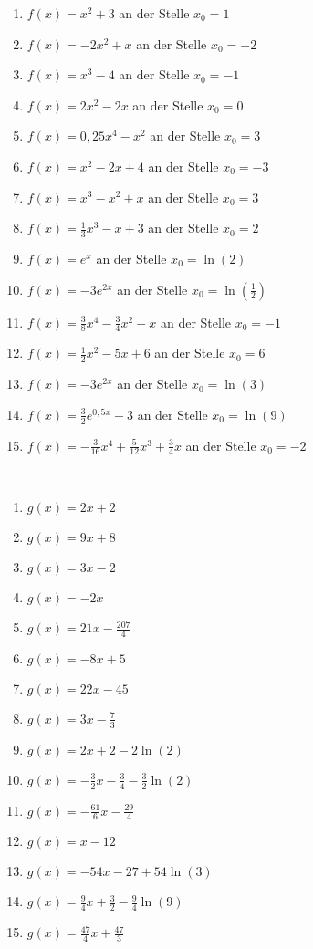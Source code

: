 \begin{Exercise}[title={\raggedright Bestimme jeweils die Tangentengleichung.}, label=tangentenBestimmenA1]
	\begin{enumerate}[label=\alph*)]
		\item \(f(x)=x^2+3\) an der Stelle \(x_0=1\)
		\item \(f(x)=-2x^2+x\) an der Stelle \(x_0=-2\)
		\item \(f(x)=x^3-4\) an der Stelle \(x_0=-1\)
		\item \(f(x)=2x^2-2x\) an der Stelle \(x_0=0\)
		\item \(f(x)=0,25x^4-x^2\) an der Stelle \(x_0=3\)
		\item \(f(x)=x^2-2x+4\) an der Stelle \(x_0=-3\)
		\item \(f(x)=x^3-x^2+x\) an der Stelle \(x_0=3\)
		\item \(f(x)=\frac{1}{3}x^3-x+3\) an der Stelle \(x_0=2\)
		\item \(f(x)=e^x\) an der Stelle \(x_0=\ln(2)\)
		\item \(f(x)=-3e^{2x}\) an der Stelle \(x_0=\ln\left(\frac{1}{2}\right)\)
		\item \(f(x)=\frac{3}{8}x^4-\frac{3}{4}x^2-x\) an der Stelle \(x_0=-1\)
		\item \(f(x)=\frac{1}{2}x^2-5x+6\) an der Stelle \(x_0=6\)
		\item \(f(x)=-3e^{2x}\) an der Stelle \(x_0=\ln(3)\)
		\item \(f(x)=\frac{3}{2}e^{0,5x}-3\) an der Stelle \(x_0=\ln(9)\)
		\item \(f(x)=-\frac{3}{16}x^4+\frac{5}{12}x^3+\frac{3}{4}x\) an der Stelle \(x_0=-2\)
	\end{enumerate}
\end{Exercise}
\begin{Answer}[ref=tangentenBestimmenA1]\\
	\begin{enumerate}[label=\alph*)]
		\item \(g(x)=2x+2\)
		\item \(g(x)=9x+8\)
		\item \(g(x)=3x-2\)
		\item \(g(x)=-2x\)
		\item \(g(x)=21x-\frac{207}{4}\)
		\item \(g(x)=-8x+5\)
		\item \(g(x)=22x-45\)
		\item \(g(x)=3x-\frac{7}{3}\)
		\item \(g(x)=2x+2-2\ln(2)\)
		\item \(g(x)=-\frac{3}{2}x-\frac{3}{4}-\frac{3}{2}\ln(2)\)
		\item \(g(x)=-\frac{61}{6}x-\frac{29}{4}\)
		\item \(g(x)=x-12\)
		\item \(g(x)=-54x-27+54\ln(3)\)
		\item \(g(x)=\frac{9}{4}x+\frac{3}{2}-\frac{9}{4}\ln(9)\)
		\item \(g(x)=\frac{47}{4}x+\frac{47}{3}\)
	\end{enumerate}
\end{Answer}